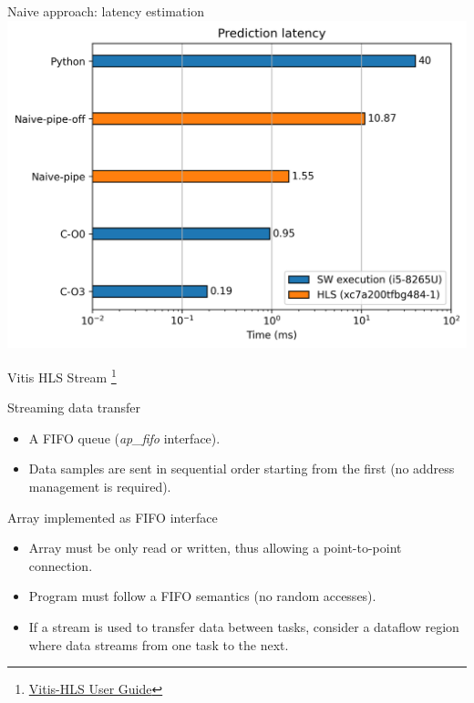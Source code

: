 \documentclass[xcolor=table]{beamer}
\begin{document}
\begin{frame}{Naive approach: latency estimation}
\centering
\includegraphics[scale=0.65]{Images/early-plot.png}
\end{frame}

\begin{frame}{Vitis HLS Stream
  \footnote{
    \href{https://docs.xilinx.com/r/en-US/ug1399-vitis-hls/HLS-Stream-Library}
    {Vitis-HLS User Guide}
  }
}
  \begin{block}{Streaming data transfer}
     \begin{itemize}
       \item
       A FIFO queue (\emph{ap\_fifo} interface).
       \item
       Data samples are sent in sequential order
       starting from the first (no address management is required).
     \end{itemize}
  \end{block}
  \begin{block}{Array implemented as FIFO interface}
    \begin{itemize}
      \item[\textcolor{orange}{\textbullet}]
      Array must be only read or written, thus allowing a point-to-point
      connection.
      \item[\textcolor{orange}{\textbullet}]
      Program must follow a FIFO semantics (no random accesses).
      \item[\textcolor{green}{\textbullet}]
      If a stream is used to transfer data between tasks, consider a dataflow region where data streams from one task to the next.
    \end{itemize}
  \end{block}
\end{frame}
\end{document}
